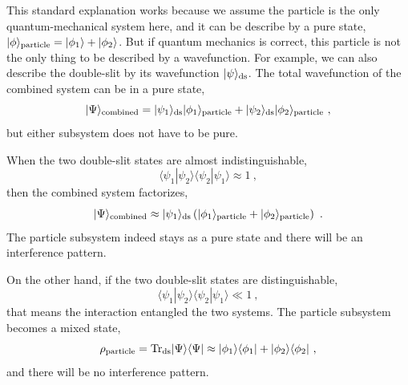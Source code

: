 \documentclass[aps,showpacs,twocolumn,floats,prd,superscriptaddress,nofootinbib]{revtex4-1}
\begin{document}
This standard explanation works because we assume the particle is the only quantum-mechanical system here, and it can be describe by a pure state, $|\phi\rangle_{\rm particle} = |\phi_1\rangle + |\phi_2\rangle$.
But if quantum mechanics is correct, this particle is not the only thing to be described by a wavefunction. 
For example, we can also describe the double-slit by its wavefunction $|\psi\rangle_{\rm ds}$. The total wavefunction of the combined system can be in a pure state,
\begin{equation}
|\Psi\rangle_{\rm combined} = |\psi_1\rangle_{\rm ds}|\phi_1\rangle_{\rm particle} 
+ |\psi_2\rangle_{\rm ds}|\phi_2\rangle_{\rm particle} ~,
\end{equation}
but either subsystem does not have to be pure.

When the two double-slit states are almost indistinguishable,
\begin{equation}
\langle\psi_1|\psi_2\rangle\langle\psi_2|\psi_1\rangle \approx 1~,
\label{eq-pure}
\end{equation}
then the combined system factorizes,
\begin{equation}
|\Psi\rangle_{\rm combined} \approx |\psi_1\rangle_{\rm ds}
\left(|\phi_1\rangle_{\rm particle} + |\phi_2\rangle_{\rm particle}\right) ~.
\end{equation}
The particle subsystem indeed stays as a pure state and there will be an interference pattern.

On the other hand, if the two double-slit states are distinguishable,
\begin{equation}
\langle\psi_1|\psi_2\rangle\langle\psi_2|\psi_1\rangle \ll 1~,
\label{eq-mixed}
\end{equation}
that means the interaction entangled the two systems. The particle subsystem becomes a mixed state,
\begin{equation}
\rho_{\rm particle} = {\rm Tr}_{\rm ds}|\Psi\rangle\langle\Psi| \approx
|\phi_1\rangle\langle\phi_1| + |\phi_2\rangle\langle\phi_2|~,
\end{equation}
and there will be no interference pattern.
\end{document}
